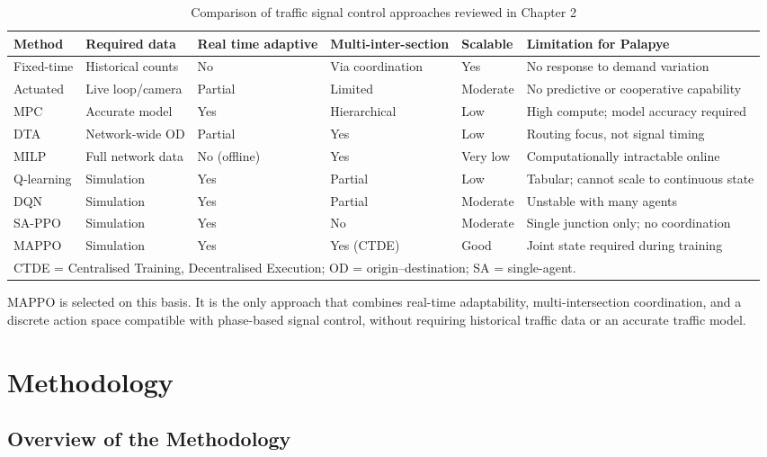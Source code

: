 ﻿\documentclass[11pt, a4paper]{report}
\begin{document}
\begin{table}[H]
\centering
\caption{Comparison of traffic signal control approaches reviewed in Chapter 2}
\label{tab:lit_review_summary}
\begin{tabular}{p{2.2cm}p{2.0cm}p{1.8cm}p{2.0cm}p{1.6cm}p{2.8cm}}
\toprule
\textbf{Method} & \textbf{Required data} & \textbf{Real time adaptive} & \textbf{Multi-inter-section} & \textbf{Scalable} & \textbf{Limitation for Palapye} \\
\midrule
Fixed-time & Historical counts & No & Via coordination & Yes & No response to demand variation \\
Actuated & Live loop/camera & Partial & Limited & Moderate & No predictive or cooperative capability \\
MPC & Accurate model & Yes & Hierarchical & Low & High compute; model accuracy required \\
DTA & Network-wide OD & Partial & Yes & Low & Routing focus, not signal timing \\
MILP & Full network data & No (offline) & Yes & Very low & Computationally intractable online \\
Q-learning & Simulation & Yes & Partial & Low & Tabular; cannot scale to continuous state \\
DQN & Simulation & Yes & Partial & Moderate & Unstable with many agents \\
SA-PPO & Simulation & Yes & No & Moderate & Single junction only; no coordination \\
MAPPO & Simulation & Yes & Yes (CTDE) & Good & Joint state required during training \\
\bottomrule
\multicolumn{6}{l}{\footnotesize CTDE = Centralised Training, Decentralised Execution; OD = origin--destination; SA = single-agent.}
\end{tabular}
\end{table}

MAPPO is selected on this basis. It is the only approach that combines real-time adaptability, multi-intersection coordination, and a discrete action space compatible with phase-based signal control, without requiring historical traffic data or an accurate traffic model.

\chapter{Methodology}

\section{Overview of the Methodology}
\end{document}
